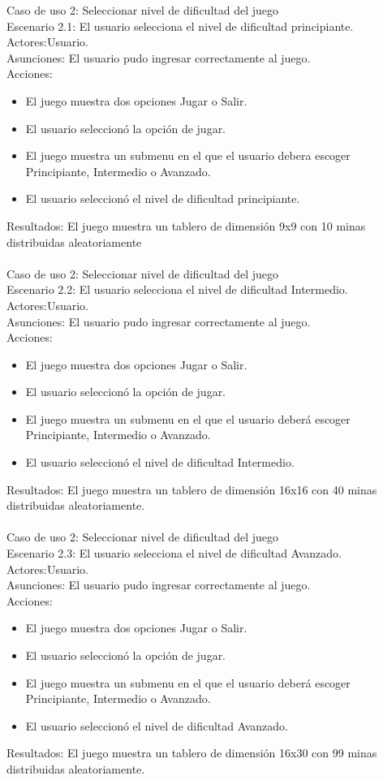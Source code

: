 \documentclass[11pt]{article} %
\begin{document}
Caso de uso 2: Seleccionar nivel de dificultad del juego
\\Escenario 2.1: El usuario selecciona el nivel de dificultad principiante.\
\\Actores:Usuario.\
\\Asunciones: El usuario pudo ingresar correctamente al juego.\
\\Acciones:\
\begin{itemize}
\item El juego muestra dos opciones Jugar o Salir.
\item El usuario seleccionó la opción de jugar.
\item El juego muestra un submenu en el que el usuario debera escoger Principiante, Intermedio o Avanzado.
\item El usuario seleccionó el nivel de dificultad principiante.
\end {itemize}
Resultados:
El juego muestra un tablero de dimensión 9x9 con 10 minas distribuidas aleatoriamente
\\   \
\\Caso de uso 2: Seleccionar nivel de dificultad del juego\
\\Escenario 2.2: El usuario selecciona el nivel de dificultad Intermedio.\
\\Actores:Usuario.\
\\Asunciones: El usuario pudo ingresar correctamente al juego.\
\\Acciones:\
\begin{itemize}
\item El juego muestra dos opciones Jugar o Salir.
\item El usuario seleccionó la opción de jugar.
\item El juego muestra un submenu en el que el usuario deberá escoger Principiante, Intermedio o Avanzado.
\item El usuario seleccionó el nivel de dificultad Intermedio.
\end {itemize}
Resultados:
El juego muestra un tablero de dimensión 16x16 con 40 minas distribuidas aleatoriamente.
\\ \
\\Caso de uso 2: Seleccionar nivel de dificultad del juego\
\\Escenario 2.3: El usuario selecciona el nivel de dificultad Avanzado.\
\\Actores:Usuario.\
\\Asunciones: El usuario pudo ingresar correctamente al juego.\
\\Acciones:\
\begin{itemize}
\item El juego muestra dos opciones Jugar o Salir.
\item El usuario seleccionó la opción de jugar.
\item El juego muestra un submenu en el que el usuario deberá escoger Principiante, Intermedio o Avanzado.
\item El usuario seleccionó el nivel de dificultad Avanzado.
\end {itemize}
Resultados:
El juego muestra un tablero de dimensión 16x30 con 99 minas distribuidas aleatoriamente.
\\ \
\end{document}
